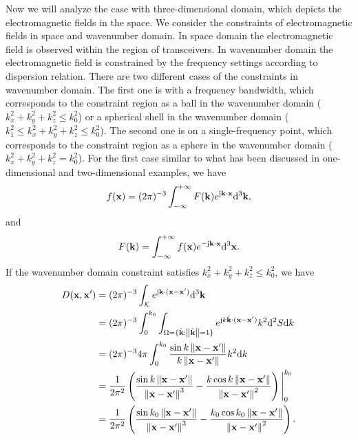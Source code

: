 \documentclass[12pt,draftclsnofoot,journal,onecolumn]{IEEEtran}
\begin{document}
	Now we will analyze the case with three-dimensional domain, which depicts the electromagnetic fields in the space. We consider the constraints of electromagnetic fields in space and wavenumber domain. In space domain the electromagnetic field is observed within the region of transceivers. In wavenumber domain the electromagnetic field is constrained by the frequency settings according to dispersion relation. There are two different cases of the constraints in wavenumber domain. The first one is with a frequency bandwidth, which corresponds to the constraint region as a ball in the wavenumber domain ($k_x^2+k_y^2+k_z^2 \leqslant k_0^2$) or a spherical shell in the wavenumber domain ($k_1^2 \leqslant k_x^2+k_y^2+k_z^2 \leqslant k_0^2$). The second one is on a single-frequency point, which corresponds to the constraint region as a sphere in the wavenumber domain ($k_x^2+k_y^2+k_z^2=k_0^2$).  For the first case similar to what has been discussed in one-dimensional and two-dimensional examples, we have 
	\begin{equation}
		\begin{aligned}
			f({\bf x})=(2\pi)^{-3}\int_{-\infty}^{+\infty}F({\bf k})e^{{\rm j}{\bf k}\cdot {\bf x}}{\rm d}^3{\bf k},
		\end{aligned}
	\end{equation}
	and
	\begin{equation}
		\begin{aligned}
			F({\bf k}) = \int_{-\infty}^{+\infty}f({\bf x})e^{-{\rm j}{\bf k}\cdot {\bf x}}{\rm d}^3{\bf x}.
		\end{aligned}
	\end{equation}
	If the wavenumber domain constraint satisfies $k_x^2+k_y^2+k_z^2 \leqslant k_0^2$, we have 
	\begin{equation}
		\begin{aligned}
			D({\bf x},{\bf x}') &= (2\pi)^{-3}\int_{\mathcal{K}} e^{{\rm j}{\bf k}\cdot({\bf x}-{\bf x}')}{\rm d}^3{\bf k} \\&= (2\pi)^{-3} \int_{0}^{k_0} \int_{{\Omega}=\{\hat{\bf k}: \left\| \hat{\bf k} \right\|=1\}} e^{{\rm j}k\hat{\bf k}\cdot({\bf x}-{\bf x}')}k^2{\rm d}^2S{\rm d}k
			\\& = (2\pi)^{-3} 4\pi \int_0^{k_0} \frac{\sin k \left\| {\bf x}-{\bf x}' \right\|}{k \left\| {\bf x}-{\bf x}' \right\|}k^2 {\rm d}k
			\\& = \frac{1}{2\pi^2} \left( \frac{\sin k\left\| {\bf x}-{\bf x}' \right\|}{\left\| {\bf x}-{\bf x}' \right\|^3}-\frac{k\cos k\left\| {\bf x}-{\bf x}' \right\|}{\left\| {\bf x}-{\bf x}' \right\|^2} \right) \Bigg|_0^{k_0}
			\\& = \frac{1}{2\pi^2} \left( \frac{\sin k_0\left\| {\bf x}-{\bf x}' \right\|}{\left\| {\bf x}-{\bf x}' \right\|^3}-\frac{k_0\cos k_0\left\| {\bf x}-{\bf x}' \right\|}{\left\| {\bf x}-{\bf x}' \right\|^2} \right).
		\end{aligned}
		\label{equ_ball}
	\end{equation}
\end{document}
